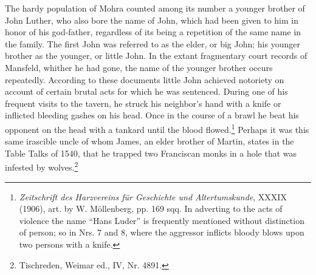 The hardy population of Mohra counted among its number a
younger brother of John Luther, who also bore the name of John,
which had been given to him in honor of his god-father, regardless of
its being a repetition of the same name in the family. The first John
was referred to as the elder, or big John; his younger brother as the
younger, or little John. In the extant fragmentary court records of
Mansfeld, whither he had gone, the name of the younger brother occurs repeatedly.
According to these documents little John achieved
notoriety on account of certain brutal acts for which he was sentenced.
During one of his frequent visits to the tavern, he struck his neighbor’s
hand with a knife or inflicted bleeding gashes on his head. Once in the
course of a brawl he beat his opponent on the head with a tankard until
the blood flowed.\footnote{
\textit{Zeitschrift des Harzvereins für Geschichte und Altertumskunde}, XXXIX (1906), art.
by W. Möllenberg, pp. 169 sqq. In adverting to the acts of violence the name “Hans
Luder” is frequently mentioned without distinction of person; so in Nrs. 7 and 8, where
the aggressor inflicts bloody blows upon two persons with a knife.
}
Perhaps it was this same irascible uncle of whom
James, an elder brother of Martin, states in the Table Talks of 1540,
that he trapped two Franciscan monks in a hole that was infested by
wolves.\footnote{Tischreden, Weimar ed., IV, Nr. 4891.}

